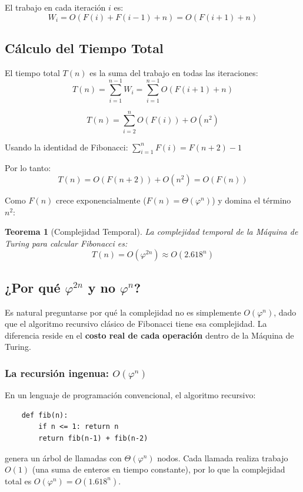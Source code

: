 \documentclass[12pt,a4paper]{article}
\newtheorem{teorema}{Teorema}
\begin{document}
El trabajo en cada iteración $i$ es:
$$W_i = O(F(i) + F(i-1) + n) = O(F(i+1) + n)$$

\subsection{Cálculo del Tiempo Total}

El tiempo total $T(n)$ es la suma del trabajo en todas las iteraciones:
$$T(n) = \sum_{i=1}^{n-1} W_i = \sum_{i=1}^{n-1} O(F(i+1) + n)$$

$$T(n) = \sum_{i=2}^{n} O(F(i)) + O(n^2)$$

Usando la identidad de Fibonacci: $\sum_{i=1}^{n} F(i) = F(n+2) - 1$

Por lo tanto:
$$T(n) = O(F(n+2)) + O(n^2) = O(F(n))$$

Como $F(n)$ crece exponencialmente ($F(n) = \Theta(\varphi^n)$) y domina el término $n^2$:

\begin{teorema}[Complejidad Temporal]
La complejidad temporal de la Máquina de Turing para calcular Fibonacci es:
$$\boxed{T(n) = O(\varphi^{2n}) \approx O(2.618^n)}$$
\end{teorema}

\subsection{¿Por qué $\varphi^{2n}$ y no $\varphi^n$?}

Es natural preguntarse por qué la complejidad no es simplemente $O(\varphi^n)$, dado que el algoritmo recursivo clásico de Fibonacci tiene esa complejidad. La diferencia reside en el \textbf{costo real de cada operación} dentro de la Máquina de Turing.

\subsubsection{La recursión ingenua: $O(\varphi^n)$}

En un lenguaje de programación convencional, el algoritmo recursivo:
\begin{verbatim}
    def fib(n):
        if n <= 1: return n
        return fib(n-1) + fib(n-2)
\end{verbatim}

genera un árbol de llamadas con $\Theta(\varphi^n)$ nodos. Cada llamada realiza trabajo $O(1)$ (una suma de enteros en tiempo constante), por lo que la complejidad total es $O(\varphi^n) = O(1.618^n)$.
\end{document}
